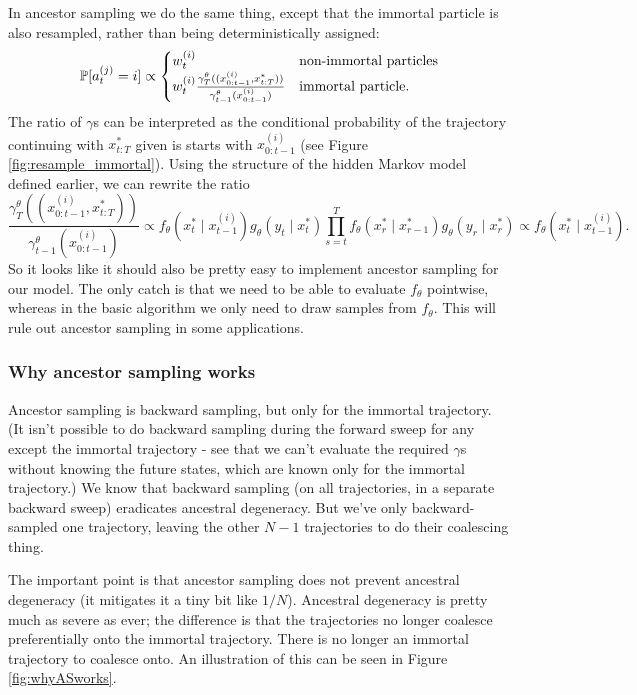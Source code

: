 In ancestor sampling we do the same thing, except that the immortal particle is also resampled, rather than being deterministically assigned:
\begin{equation*}
\mathbb{P}[a_t^{(j)} = i] \propto
\begin{cases}
w_t^{(i)} &\text{non-immortal particles}\\
w_t^{(i)} \frac{\gamma_T^\theta((x_{0:t-1}^{(i)}, x_{t:T}^*))}{\gamma_{t-1}^\theta(x_{0:t-1}^{(i)})} &\text{immortal particle} .
\end{cases}
\end{equation*}
The ratio of $\gamma$s can be interpreted as the conditional probability of the trajectory continuing with $x_{t:T}^*$ given is starts with $x_{0:t-1}^{(i)}$ (see Figure \ref{fig:resample_immortal}).
Using the structure of the hidden Markov model defined earlier, we can rewrite the ratio
\begin{equation*}
\frac{\gamma_T^\theta((x_{0:t-1}^{(i)}, x_{t:T}^*))}{\gamma_{t-1}^\theta(x_{0:t-1}^{(i)})}
\propto f_\theta(x_t^* \mid x_{t-1}^{(i)}) g_\theta(y_t \mid x_t^*) \prod_{s=t}^T f_\theta(x_r^* \mid x_{r-1}^*) g_\theta(y_r \mid x_r^*)
\propto f_\theta(x_t^* \mid x_{t-1}^{(i)}) .
\end{equation*}
So it looks like it should also be pretty easy to implement ancestor sampling for our model. 
The only catch is that we need to be able to evaluate $f_\theta$ pointwise, whereas in the basic algorithm we only need to draw samples from $f_\theta$. This will rule out ancestor sampling in some applications.


\subsubsection{Why ancestor sampling works}

Ancestor sampling is backward sampling, but only for the immortal trajectory. (It isn't possible to do backward sampling during the forward sweep for any except the immortal trajectory - see that we can't evaluate the required $\gamma$s without knowing the future states, which are known only for the immortal trajectory.)
We know that backward sampling (on all trajectories, in a separate backward sweep) eradicates ancestral degeneracy. But we've only backward-sampled one trajectory, leaving the other $N-1$ trajectories to do their coalescing thing.

The important point is that ancestor sampling does not prevent ancestral degeneracy (it mitigates it a tiny bit like $1/N$). Ancestral degeneracy is pretty much as severe as ever; the difference is that the trajectories no longer coalesce preferentially onto the immortal trajectory. There is no longer an immortal trajectory to coalesce onto. An illustration of this can be seen in Figure \ref{fig:whyASworks}.

